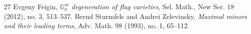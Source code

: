 \begin{thebibliography}{27}
 Evgeny Feigin, \emph{$\mathbb{G}_a^m$ degeneration of flag varieties}, Sel. Math., New Ser. 18 (2012), no. 3, 513--537.
 Bernd Sturmfels and Andrei Zelevinsky, \emph{Maximal minors and their leading terms}, Adv. Math. 98 (1993), no. 1, 65--112.
\end{thebibliography}
